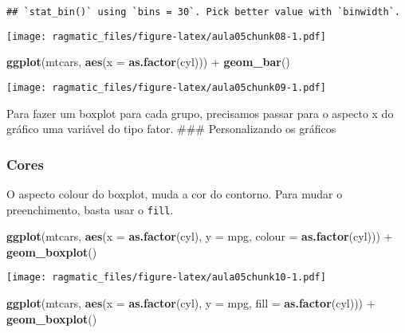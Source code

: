 \documentclass[]{book}
\newenvironment{Shaded}{\begin{snugshade}}{\end{snugshade}}
\newcommand{\KeywordTok}[1]{\textcolor[rgb]{0.13,0.29,0.53}{\textbf{{#1}}}}
\newcommand{\DataTypeTok}[1]{\textcolor[rgb]{0.13,0.29,0.53}{{#1}}}
\newcommand{\StringTok}[1]{\textcolor[rgb]{0.31,0.60,0.02}{{#1}}}
\newcommand{\NormalTok}[1]{{#1}}
\begin{document}
\begin{verbatim}
## `stat_bin()` using `bins = 30`. Pick better value with `binwidth`.
\end{verbatim}

\texttt{[image: ragmatic\_files/figure-latex/aula05chunk08-1.pdf]}

\begin{Shaded}
\begin{Highlighting}[]
\KeywordTok{ggplot}\NormalTok{(mtcars, }\KeywordTok{aes}\NormalTok{(}\DataTypeTok{x =} \KeywordTok{as.factor}\NormalTok{(cyl))) +}\StringTok{ }
\StringTok{  }\KeywordTok{geom_bar}\NormalTok{()}
\end{Highlighting}
\end{Shaded}

\texttt{[image: ragmatic\_files/figure-latex/aula05chunk09-1.pdf]}

Para fazer um boxplot para cada grupo, precisamos passar para o aspecto
x do gráfico uma variável do tipo fator. \#\#\# Personalizando os
gráficos

\subsubsection{Cores}\label{cores}

O aspecto colour do boxplot, muda a cor do contorno. Para mudar o
preenchimento, basta usar o \texttt{fill}.

\begin{Shaded}
\begin{Highlighting}[]
\KeywordTok{ggplot}\NormalTok{(mtcars, }\KeywordTok{aes}\NormalTok{(}\DataTypeTok{x =} \KeywordTok{as.factor}\NormalTok{(cyl), }\DataTypeTok{y =} \NormalTok{mpg, }\DataTypeTok{colour =} \KeywordTok{as.factor}\NormalTok{(cyl))) +}\StringTok{ }
\StringTok{  }\KeywordTok{geom_boxplot}\NormalTok{()}
\end{Highlighting}
\end{Shaded}

\texttt{[image: ragmatic\_files/figure-latex/aula05chunk10-1.pdf]}

\begin{Shaded}
\begin{Highlighting}[]
\KeywordTok{ggplot}\NormalTok{(mtcars, }\KeywordTok{aes}\NormalTok{(}\DataTypeTok{x =} \KeywordTok{as.factor}\NormalTok{(cyl), }\DataTypeTok{y =} \NormalTok{mpg, }\DataTypeTok{fill =} \KeywordTok{as.factor}\NormalTok{(cyl))) +}\StringTok{ }\KeywordTok{geom_boxplot}\NormalTok{()}
\end{Highlighting}
\end{Shaded}
\end{document}
